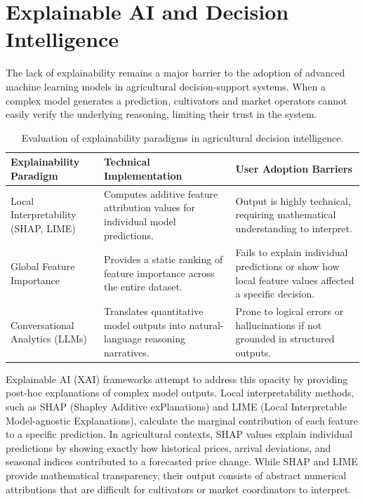 \documentclass[12pt,a4paper]{report}
\theoremstyle{definition}
\theoremstyle{remark}
\begin{document}
\section{Explainable AI and Decision Intelligence}

The lack of explainability remains a major barrier to the adoption of advanced machine learning models in agricultural decision-support systems. When a complex model generates a prediction, cultivators and market operators cannot easily verify the underlying reasoning, limiting their trust in the system.

\begin{table}[htbp]
\centering
\caption{Evaluation of explainability paradigms in agricultural decision intelligence.}
\label{tab:explainability_comparison}
\begin{tabular}{p{3.5cm}|p{5.5cm}|p{5.5cm}}
\hline
\textbf{Explainability Paradigm} & \textbf{Technical Implementation} & \textbf{User Adoption Barriers} \\
\hline
Local Interpretability (SHAP, LIME) & Computes additive feature attribution values for individual model predictions. & Output is highly technical, requiring mathematical understanding to interpret. \\
\hline
Global Feature Importance & Provides a static ranking of feature importance across the entire dataset. & Fails to explain individual predictions or show how local feature values affected a specific decision. \\
\hline
Conversational Analytics (LLMs) & Translates quantitative model outputs into natural-language reasoning narratives. & Prone to logical errors or hallucinations if not grounded in structured outputs. \\
\hline
\end{tabular}
\end{table}

Explainable AI (XAI) frameworks attempt to address this opacity by providing post-hoc explanations of complex model outputs. Local interpretability methods, such as SHAP (Shapley Additive exPlanations) and LIME (Local Interpretable Model-agnostic Explanations), calculate the marginal contribution of each feature to a specific prediction. In agricultural contexts, SHAP values explain individual predictions by showing exactly how historical prices, arrival deviations, and seasonal indices contributed to a forecasted price change. While SHAP and LIME provide mathematical transparency, their output consists of abstract numerical attributions that are difficult for cultivators or market coordinators to interpret.
\end{document}
